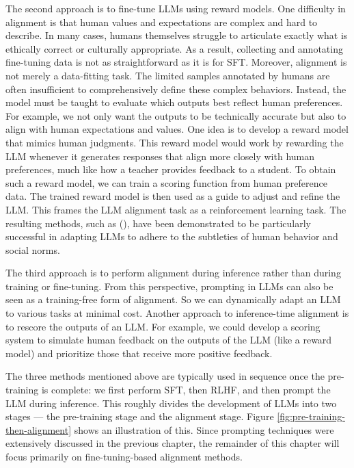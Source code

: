 The second approach is to fine-tune LLMs using reward models. One difficulty in alignment is that human values and expectations are complex and hard to describe. In many cases, humans themselves struggle to articulate exactly what is ethically correct or culturally appropriate. As a result, collecting and annotating fine-tuning data is not as straightforward as it is for SFT. Moreover, alignment is not merely a data-fitting task. The limited samples annotated by humans are often insufficient to comprehensively define these complex behaviors. Instead, the model must be taught to evaluate which outputs best reflect human preferences. For example, we not only want the outputs to be technically accurate but also to align with human expectations and values. One idea is to develop a reward model that mimics human judgments. This reward model would work by rewarding the LLM whenever it generates responses that align more closely with human preferences, much like how a teacher provides feedback to a student. To obtain such a reward model, we can train a scoring function from human preference data. The trained reward model is then used as a guide to adjust and refine the LLM. This frames the LLM alignment task as a reinforcement learning task. The resulting methods, such as  (), have been demonstrated to be particularly successful in adapting LLMs to adhere to the subtleties of human behavior and social norms.

The third approach is to perform alignment during inference rather than during training or fine-tuning. From this perspective, prompting in LLMs can also be seen as a training-free form of alignment. So we can dynamically adapt an LLM to various tasks at minimal cost. Another approach to inference-time alignment is to rescore the outputs of an LLM. For example, we could develop a scoring system to simulate human feedback on the outputs of the LLM (like a reward model) and prioritize those that receive more positive feedback.

The three methods mentioned above are typically used in sequence once the pre-training is complete: we first perform SFT, then RLHF, and then prompt the LLM during inference. This roughly divides the development of LLMs into two stages --- the pre-training stage and the alignment stage. Figure \ref{fig:pre-training-then-alignment} shows an illustration of this. Since prompting techniques were extensively discussed in the previous chapter, the remainder of this chapter will focus primarily on fine-tuning-based alignment methods.

